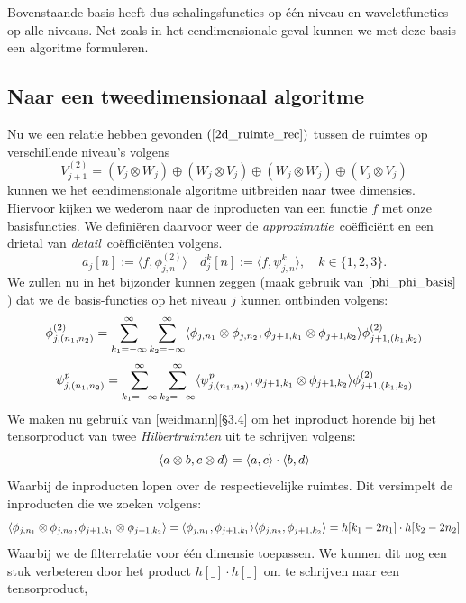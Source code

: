 Bovenstaande basis heeft dus schalingsfuncties op \'e\'en niveau en waveletfuncties op alle niveaus. Net zoals in het eendimensionale geval kunnen we met deze basis een algoritme formuleren.

\subsection{Naar een tweedimensionaal algoritme}
Nu we een relatie hebben gevonden $(\ref{2d_ruimte_rec})$ tussen de ruimtes op verschillende
niveau's volgens
\begin{equation}
  \label{2d_ruimte_decomp}
V_{j+1}^{(2)} = (V_j\otimes W_j) \oplus (W_j\otimes V_j) \oplus
(W_j\otimes W_j) \oplus (V_j\otimes V_j)
\end{equation}
kunnen we het eendimensionale algoritme uitbreiden naar twee dimensies.
Hiervoor kijken we wederom naar de inproducten van een functie $f$ met
onze basisfuncties.
We defini\"eren daarvoor weer de \emph{approximatie}~co\"effici\"ent en een drietal
van \emph{detail}~co\"effici\"enten volgens.
\[
a_j[n] := \langle f, \phi^{(2)}_{j,n} \rangle \quad d^k_j[n] := \langle f, \psi^k_{j,n} \rangle ,\quad k \in \{1,2,3\}.
\]
We zullen nu in het bijzonder kunnen zeggen (maak gebruik van $\ref{phi_phi_basis}$)
dat we de basis-functies op het niveau $j$ kunnen ontbinden volgens:
\begin{equation}
  \label{phi_phi_som}
  \phi^{(2)}_{j,(n_1,n_2)} = \sum_{k_1=-\infty}^\infty \sum_{k_2=-\infty}^\infty
  \langle \phi_{j,n_1}\otimes\phi_{j,n_2} , \phi_{j+1,k_1}\otimes\phi_{j+1,k_2} \rangle
  \phi^{(2)}_{j+1,(k_1,k_2)}
\end{equation}
\begin{equation}
  \label{psi_k_som}
  \psi^{p}_{j,(n_1,n_2)} = \sum_{k_1=-\infty}^\infty \sum_{k_2=-\infty}^\infty
  \langle \psi^p_{j,(n_1,n_2)} , \phi_{j+1,k_1}\otimes\phi_{j+1,k_2} \rangle
  \phi^{(2)}_{j+1,(k_1,k_2)}
\end{equation}
We maken nu gebruik van \ref{weidmann}[\S 3.4] om het inproduct horende bij het tensorproduct
van twee \emph{Hilbertruimten} uit te schrijven volgens:
\[
\langle a\otimes b , c\otimes d \rangle = \langle a , c \rangle\cdot \langle b , d \rangle
\]
Waarbij de inproducten lopen over de respectievelijke ruimtes.
Dit versimpelt de inproducten die we zoeken volgens:
\[
\langle \phi_{j,n_1}\otimes\phi_{j,n_2} , \phi_{j+1,k_1}\otimes\phi_{j+1,k_2} \rangle
=\langle \phi_{j,n_1} , \phi_{j+1,k_1} \rangle\langle \phi_{j,n_2} , \phi_{j+1,k_2} \rangle
=h[k_1-2n_1]\cdot h[k_2-2n_2]
\]
Waarbij we de filterrelatie voor \'e\'en dimensie toepassen. We kunnen dit nog een
stuk verbeteren door het product $h[\_]\cdot h[\_]$ om te schrijven naar een tensorproduct,
